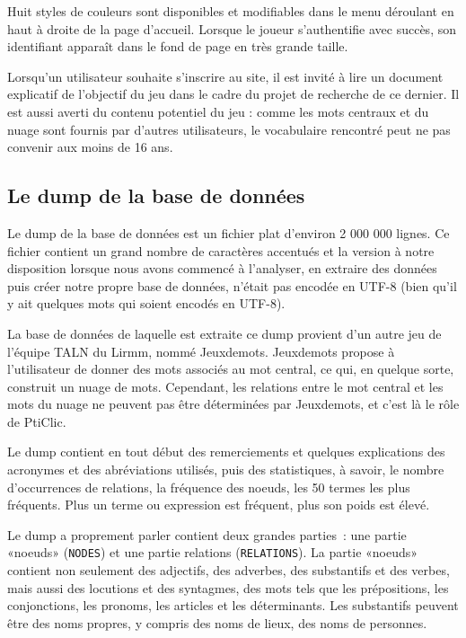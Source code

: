 \documentclass[a4paper,11pt,french]{article}
\begin{document}
Huit styles de couleurs sont disponibles et modifiables dans le menu déroulant en haut à droite de la page d'accueil. Lorsque le joueur s'authentifie avec succès, son identifiant apparaît dans le fond de page en très grande taille.


Lorsqu'un utilisateur souhaite s'inscrire au site, il est invité à lire un document explicatif de l'objectif du jeu dans le cadre du projet
de recherche de ce dernier. Il est aussi averti du contenu potentiel du jeu : comme les mots centraux et du nuage sont fournis par d'autres
utilisateurs, le vocabulaire rencontré peut ne pas convenir aux moins de 16 ans.



\subsection{Le dump de la base de données}

Le dump de la base de données est un fichier plat d'environ 2 000 000 lignes. Ce fichier contient un grand nombre de caractères accentués et
la version à notre disposition lorsque nous avons commencé à l'analyser, en extraire des données puis créer notre propre base de données,
n'était pas encodée en UTF-8 (bien qu'il y ait quelques mots qui soient encodés en UTF-8).

La base de données de laquelle est extraite ce dump provient d'un autre jeu de l'équipe TALN du Lirmm, nommé Jeuxdemots. Jeuxdemots propose
à l'utilisateur de donner des mots associés au mot central, ce qui, en quelque sorte, construit un nuage de mots. Cependant, les relations
entre le mot central et les mots du nuage ne peuvent pas être déterminées par Jeuxdemots, et c'est là le rôle de PtiClic.

Le dump contient en tout début des remerciements et quelques explications des acronymes et des abréviations utilisés, puis des statistiques, à savoir, le nombre d'occurrences de relations, la fréquence des noeuds, les 50 termes les plus fréquents. Plus un terme ou expression est fréquent, plus son poids est élevé. 

Le dump a proprement parler contient deux grandes parties~: une partie «noeuds» (\verb!NODES!) et une partie relations (\verb!RELATIONS!). La partie «noeuds»  contient non seulement des adjectifs, des adverbes, des substantifs et des verbes, mais aussi des locutions et des syntagmes, des mots tels que les prépositions, les conjonctions, les pronoms, les articles et les déterminants. Les substantifs peuvent être des noms propres, y compris des noms de lieux, des noms de personnes. 
\end{document}
